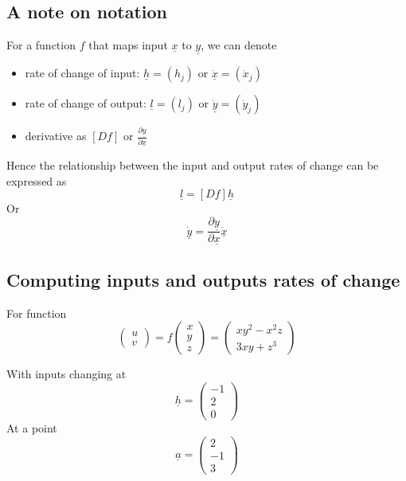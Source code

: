 \subsection{A note on notation}
\begin{framed}
For a function $f$ that maps input $ \underline{x}$ to $ \underline{y}$, we can denote
\begin{itemize}
   \item rate of change of input: $ \underline{h} = (h_j) $ or $ \underline{\dot x} = ( \dot x_j)$
   \item rate of change of output: $ \underline{l} = (l_j) $ or $ \underline{\dot y} = ( \dot y_j)$ 
   \item derivative as $[Df]$ or $ \frac{\partial \underline{y}}{\partial \underline{x}}$
\end{itemize}

Hence the relationship between the input and output rates of change can be expressed as \[
         \underline{l} = [Df] \underline{h}
   \] 
Or 
   \[
     \underline{\dot y} = \frac{\partial \underline{y}}{\partial \underline{x}} \underline{\dot x}
   \] 
\end{framed}

\subsection{Computing inputs and outputs rates of change}

For function \[
   \begin{pmatrix} u \\ v \end{pmatrix}  = f \begin{pmatrix} x \\y\\z \end{pmatrix}  = \begin{pmatrix} 
     xy^2 - x^2 z \\ 3xy + z^3  
   \end{pmatrix}
\] 

With inputs changing at \[
  \underline{h} = \begin{pmatrix} -1 \\2 \\0 \end{pmatrix} 
\]
At a point \[
  \underline{a} = \begin{pmatrix}  2 \\ -1 \\3 \end{pmatrix} 
\] 


